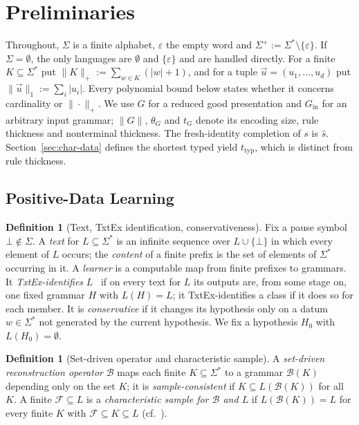 \documentclass[11pt]{article}
\numberwithin{equation}{section}
\theoremstyle{plain}
\theoremstyle{definition}
\newtheorem{definition}[theorem]{Definition}
\theoremstyle{remark}
\newcommand{\tuple}[1]{\vec{#1}}
\newcommand{\eps}{\varepsilon}
\newcommand{\pausesym}{\bot}
\theoremstyle{plain}
\begin{document}
\section{Preliminaries}
\label{sec:prelim}

Throughout, $\Sigma$ is a finite alphabet, $\eps$ the empty word and
$\Sigma^+:=\Sigma^*\setminus\{\eps\}$.  If $\Sigma=\emptyset$, the only
languages are $\emptyset$ and $\{\eps\}$ and are handled directly.  For a
finite $K\subseteq\Sigma^*$ put $\|K\|_+:=\sum_{w\in K}(|w|+1)$, and for a
tuple $\tuple u=(u_1,\ldots,u_d)$ put $\|\tuple u\|_1:=\sum_i|u_i|$.  Every
polynomial bound below states whether it concerns cardinality or
$\|\cdot\|_+$.  We use $G$ for a reduced good presentation and $G_{\mathrm{in}}$ for
an arbitrary input grammar; $\|G\|$, $\theta_G$ and $t_G$ denote
its encoding size, rule thickness and nonterminal thickness.
The fresh-identity completion of $s$ is $\widehat s$.
Section~\ref{sec:char-data} defines the shortest typed yield
$t_{\mathrm{typ}}$, which is distinct from rule thickness.

\subsection{Positive-Data Learning}

\begin{definition}[Text, TxtEx identification, conservativeness]
Fix a pause symbol $\pausesym\notin\Sigma$.  A \emph{text} for
$L\subseteq\Sigma^*$ is an infinite sequence over $L\cup\{\pausesym\}$ in which
every element of $L$ occurs; the \emph{content} of a finite prefix is the set
of elements of $\Sigma^*$ occurring in it.  A \emph{learner} is a computable map
from finite prefixes to grammars.  It \emph{TxtEx-identifies} $L$~\cite{Gold1967}
if on every text for $L$ its outputs are, from some stage on, one fixed grammar
$H$ with $L(H)=L$; it TxtEx-identifies a class if it does so for each member.
It is \emph{conservative} if it changes its hypothesis only on a datum
$w\in\Sigma^*$ not generated by the current hypothesis.  We fix a hypothesis
$H_0$ with $L(H_0)=\emptyset$.
\end{definition}

\begin{definition}[Set-driven operator and characteristic sample]
\label{def:characteristic-sample}
A \emph{set-driven reconstruction operator} $\mathcal B$ maps each finite
$K\subseteq\Sigma^*$ to a grammar $\mathcal B(K)$ depending only on the set
$K$; it is \emph{sample-consistent} if $K\subseteq L(\mathcal B(K))$ for all
$K$.  A finite $\mathcal F\subseteq L$ is a \emph{characteristic sample for
$\mathcal B$ and $L$} if $L(\mathcal B(K))=L$ for every finite $K$ with
$\mathcal F\subseteq K\subseteq L$ (cf.~\cite{deLaHiguera1997}).
\end{definition}
\end{document}

